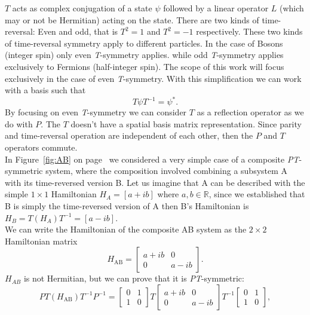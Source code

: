 \documentclass[10pt, a4paper, singlespacing, headsepline]{report}
\newcommand\PT{\emph{PT}}
\newcommand\TT{\emph{T}}
\begin{document}
$T$ acts as complex conjugation of a state $\psi$ followed by a linear operator $L$ (which may or not be Hermitian) acting on the state. There are two kinds of time-reversal: Even and odd, that is $T^2 = 1$ and $T^2 = -1$ respectively. These two kinds of time-reversal symmetry apply to different particles. In the case of Bosons (integer spin) only even \TT-symmetry applies. while odd \TT-symmetry applies exclusively to Fermions (half-integer spin)\cite{Jones-Smith}.
The scope of this work will focus exclusively in the case of even \TT-symmetry. With this simplification we can work with a basis such that 
\begin{equation} \label{eq:4}
T \psi T^{-1} = \psi^{*}.
\end{equation}
By focusing on even \TT-symmetry we can consider $T$ as a reflection operator as we do with $P$. The $T$ doesn't have a spatial basis matrix representation.
Since parity and time-reversal operation are independent of each other, then the $P$ and $T$ operators commute\cite{BenderPT}.\\
In Figure~\ref{fig:AB} on page~\pageref{fig:AB} we considered a very simple case of a composite \PT-symmetric system, where the composition involved combining a subsystem A with its time-reversed version B.
Let us imagine that A can be described with the simple $1 \times 1 $ Hamiltonian $H_{A} = [a+ib]$ where $a, b \in \mathds{R}$, since we established that B is simply the time-reversed version of A then B's Hamiltonian is $H_{B} = T (H_{A}) T^{-1} = [a-ib]$.\\
We can write the Hamiltonian of the composite AB system as the $2 \times 2$ Hamiltonian matrix
\begin{equation} \label{eq:5}
H_{\mathrm{AB}} = \begin{bmatrix}
a+ib & 0 \\ 
0 & a-ib
\end{bmatrix}.
\end{equation}
$H_{AB}$ is not Hermitian, but we can prove that it is \PT-symmetric:
\begin{equation} \label{eq:6}
PT(H_{\mathrm{AB}})T^{-1}P^{-1} = \begin{bmatrix}
0 & 1 \\ 
1 & 0
\end{bmatrix}
T
\begin{bmatrix}
a+ib & 0 \\ 
0 & a-ib
\end{bmatrix}
T^{-1}
\begin{bmatrix}
0 & 1 \\ 
1 & 0
\end{bmatrix},
\end{equation}
\end{document}
